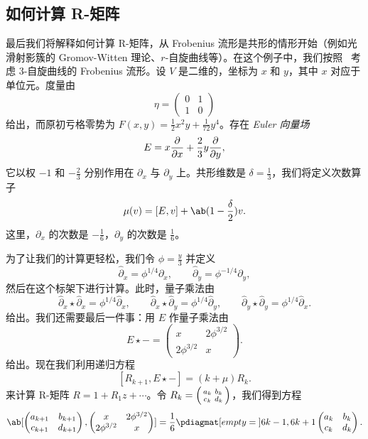 \documentclass{amsart}
\theoremstyle{definition}
\theoremstyle{remark}
\theoremstyle{plain}
\theoremstyle{definition}
\theoremstyle{remark}
\newcommand{\1}{\mathbf{1}}
\newcommand{\2}{\mathbf{2}}
\newcommand{\3}{\mathbf{3}}
\begin{document}
\subsection{如何计算 R-矩阵}%
\label{sub:How to compute the R-matrix}

最后我们将解释如何计算 R-矩阵，从 Frobenius 流形是共形的情形开始（例如光滑射影簇的 Gromov-Witten 理论、\(r\)-自旋曲线等）。在这个例子中，我们按照~\cite{PPZ2015} 考虑 3-自旋曲线的 Frobenius 流形。设 \(V\) 是二维的，坐标为 \(x\) 和 \(y\)，其中 \(x\) 对应于单位元。度量由
\[ \eta = \begin{pmatrix}
    0 & 1 \\
    1 & 0
\end{pmatrix} \]
给出，而原初亏格零势为 \(F(x,y) = \frac{1}{2} x^2 y + \frac{1}{72} y^4\)。存在 \textit{Euler 向量场}
\[ E = x \pdv{}{x} + \frac{2}{3} y \pdv{}{y}, \]
它以权 \(-1\) 和 \(-\frac{2}{3}\) 分别作用在 \(\partial_x\) 与 \(\partial_y\) 上。共形维数是 \(\delta = \frac{1}{3}\)，我们将定义次数算子
\[ \mu(v) = [E,v] + \ab(1 - \frac{\delta}{2})v. \]
这里，\(\partial_x\) 的次数是 \(-\frac{1}{6}\)，\(\partial_y\) 的次数是 \(\frac{1}{6}\)。

为了让我们的计算更轻松，我们令 \(\phi = \frac{y}{3}\) 并定义
\[ \hat{\partial}_x = \phi^{1/4} \partial_x, \qquad \hat{\partial}_y = \phi^{-1/4} \partial_y, \]
然后在这个标架下进行计算。此时，量子乘法由
\[ \hat{\partial}_x \star \hat{\partial}_x = \phi^{1/4} \hat{\partial}_x, \qquad \hat{\partial}_x \star \hat{\partial}_y = \phi^{1/4} \hat{\partial}_y, \qquad \hat{\partial}_y \star \hat{\partial}_y = \phi^{1/4} \hat{\partial}_x. \]
给出。我们还需要最后一件事：用 \(E\) 作量子乘法由
\[ E \star - = \begin{pmatrix}
    x & 2 \phi^{3/2} \\
    2 \phi^{3/2} & x
\end{pmatrix}. \]
给出。现在我们利用递归方程
\[ [R_{k+1}, E \star -] = (k + \mu) R_k. \]
来计算 R-矩阵 \(R = 1 + R_1 z + \cdots\)。令 \(R_k = \begin{psmallmatrix}
    a_k & b_k \\
    c_k & d_k
\end{psmallmatrix}\)，我们得到方程
\[ \ab[
    \begin{pmatrix}
        a_{k+1} & b_{k+1} \\
        c_{k+1} & d_{k+1}
    \end{pmatrix}, \begin{pmatrix}
        x & 2 \phi^{3/2} \\
        2 \phi^{3/2} & x
    \end{pmatrix}
] = \frac{1}{6} \pdiagmat[empty={}]{6k-1, 6k+1} \begin{pmatrix}
    a_k & b_k \\
    c_k & d_k
\end{pmatrix}. \]
\end{document}
